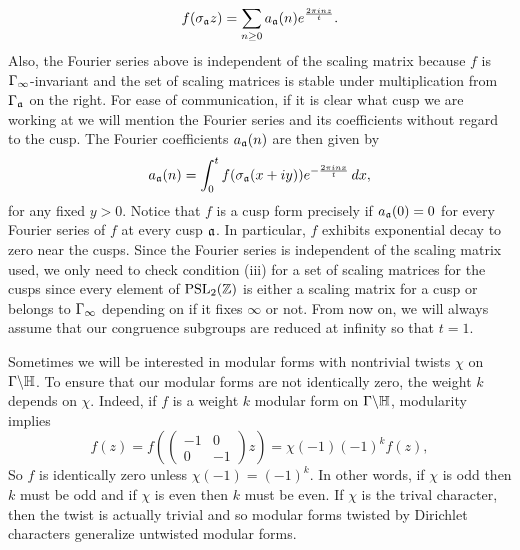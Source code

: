       \[
        f(\sigma_{\mathfrak{a}}z) = \sum_{n \ge 0}a_{\mathfrak{a}}(n)e^{\frac{2\pi inz}{t}}.
      \]
      Also, the Fourier series above is independent of the scaling matrix because $f$ is $\Gamma_{\infty}$-invariant and the set of scaling matrices is stable under multiplication from $\Gamma_{\mathfrak{a}}$ on the right. For ease of communication, if it is clear what cusp we are working at we will mention the Fourier series and its coefficients without regard to the cusp. The Fourier coefficients $a_{\mathfrak{a}}(n)$ are then given by
      \[
        a_{\mathfrak{a}}(n) = \int_{0}^{t}f(\sigma_{\mathfrak{a}}(x+iy))e^{-\frac{2\pi inx}{t}}\,dx,
      \]
      for any fixed $y > 0$. Notice that $f$ is a cusp form precisely if $a_{\mathfrak{a}}(0) = 0$ for every Fourier series of $f$ at every cusp $\mathfrak{a}$. In particular, $f$ exhibits exponential decay to zero near the cusps. Since the Fourier series is independent of the scaling matrix used, we only need to check condition (iii) for a set of scaling matrices for the cusps since every element of $\mathrm{PSL}_{2}(\mathbb{Z})$ is either a scaling matrix for a cusp or belongs to $\Gamma_{\infty}$ depending on if it fixes $\infty$ or not. From now on, we will always assume that our congruence subgroups are reduced at infinity so that $t = 1$.
      
      Sometimes we will be interested in modular forms with nontrivial twists $\chi$ on $\Gamma\backslash\mathbb{H}$. To ensure that our modular forms are not identically zero, the weight $k$ depends on $\chi$. Indeed, if $f$ is a weight $k$ modular form on $\Gamma\backslash\mathbb{H}$, modularity implies
      \[
        f(z) = f\left(\begin{pmatrix} -1 & 0 \\ 0 & -1 \end{pmatrix}z\right) = \chi(-1)(-1)^{k}f(z),
      \]
      So $f$ is identically zero unless $\chi(-1) = (-1)^{k}$. In other words, if $\chi$ is odd then $k$ must be odd and if $\chi$ is even then $k$ must be even. If $\chi$ is the trival character, then the twist is actually trivial and so modular forms twisted by Dirichlet characters generalize untwisted modular forms.

